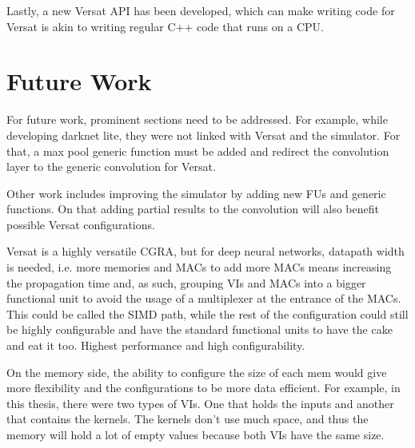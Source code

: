 Lastly, a new Versat API has been developed, which can make writing code for
Versat is akin to writing regular C++ code that runs on a CPU.


\section{Future Work}
\label{section:future}

For future work, prominent sections need to be addressed. For example, while developing darknet lite,
they were not linked with Versat and the simulator. For that, a max pool generic function
must be added and redirect the convolution layer to the generic convolution for Versat.

Other work includes improving the simulator by adding new FUs and generic functions. On that
adding partial results to the convolution will also benefit possible Versat configurations.

Versat is a highly versatile CGRA, but for deep neural networks, datapath width is needed, i.e.
more memories and MACs to add more MACs means increasing the propagation time and, as such, grouping VIs and MACs into a bigger functional unit to avoid the usage of a multiplexer at the entrance of the MACs. This could be called the SIMD path, while the rest of the configuration
could still be highly configurable and have the standard functional units to have the cake and eat it too.
Highest performance and high configurability.

On the memory side, the ability to configure the size of each mem would give more flexibility
and the configurations to be more data efficient. For example, in this thesis, there were two types of VIs. One
that holds the inputs and another that contains the kernels. The kernels don't use much space, and thus
the memory will hold a lot of empty values because both VIs have the same size.



